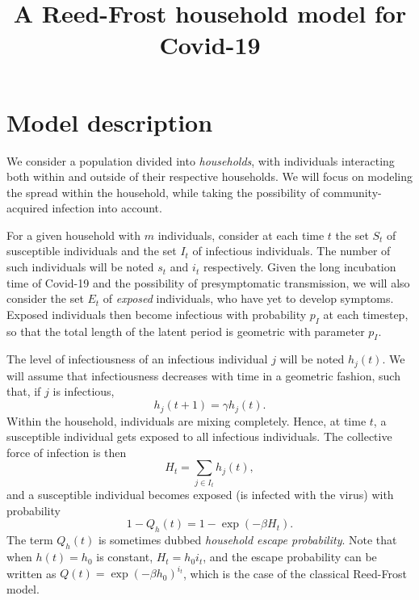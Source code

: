 \documentclass[a4paper]{article}
\title{A Reed-Frost household model for Covid-19}
\begin{document}
\maketitle

\section*{Model description}

We consider a population divided into \emph{households}, with individuals
interacting both within and outside of their respective households. We will 
focus on modeling the spread within the household, while taking the possibility
of community-acquired infection into account. 

For a given household with \(m\) individuals, consider at each time \(t\) the
set \(S_t\) of susceptible individuals and the set \(I_t\) of infectious
individuals. The number of such individuals will be noted \(s_t\) and \(i_t\)
respectively. Given the long incubation time of Covid-19 and the possibility of
presymptomatic transmission, we will also consider the set \(E_t\) of 
\emph{exposed} individuals, who have yet to develop symptoms. Exposed 
individuals then become infectious with probability \(p_I\) at each timestep, so
that the total length of the latent period is geometric with parameter \(p_I\).

The level of infectiousness of an infectious individual \(j\) will be noted 
\(h_j(t)\). We will assume that infectiousness decreases with time in a 
geometric fashion, such that, if \(j\) is infectious, 
\begin{equation}
	h_j(t+1) = \gamma h_j(t).
\end{equation}
Within the household, individuals are mixing completely. Hence, at time \(t\), a
susceptible individual gets exposed to all infectious individuals. The 
collective force of infection is then 
\begin{equation}
	H_t = \sum_{j\in I_t} h_j(t),
\end{equation}
and a susceptible individual becomes exposed (is infected with the virus) with
probability
\begin{equation}
	1-Q_h(t) = 1- \exp(-\beta H_t).
\end{equation}
The term \(Q_h(t)\) is sometimes dubbed \emph{household escape probability}. 
Note that when \(h(t)=h_0\) is constant, \(H_t=h_0 i_t\), and the escape
probability can be written as \(Q(t) = \exp(-\beta h_0)^{i_t}\), which is the
case of the classical Reed-Frost model.
\end{document}
